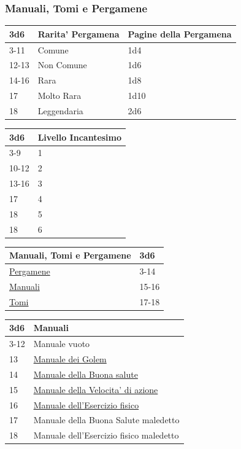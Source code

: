 \begin{multicols}{2}
{\subsubsection{Manuali, Tomi e Pergamene}\hypertarget{manualitomi}{}\label{manualitomi}\label{CPergamene}\hypertarget{CPergamene}{}

{\small \begin{tabularx}{0.48\textwidth}{lll}
		\toprule
\textbf{3d6} & \textbf{Rarita' Pergamena} & \textbf{Pagine della Pergamena}\\
\toprule
3-11 &Comune & 1d4 \\
12-13 &Non Comune & 1d6 \\
14-16 &Rara & 1d8 \\
17 & Molto Rara & 1d10\\
18 & Leggendaria & 2d6\\
\end{tabularx}}

\medskip

{\small \begin{tabularx}{0.48\textwidth}{ll}
		\toprule
	\textbf{3d6} & \textbf{Livello Incantesimo}\\
	\toprule
	3-9 & 1 \\
	10-12 & 2 \\
	13-16 & 3  \\
	17 & 4  \\
	18 & 5 \\
	18 & 6 \\
\end{tabularx}}

\medskip

{\small\begin{tabularx}{0.45\textwidth}{lX}
		\toprule
		\textbf{Manuali, Tomi e Pergamene}&\textbf{3d6}\\
		\toprule
		\hyperlink{manualitomi}{Pergamene} &3-14\\
		\hyperlink{manualitomi}{Manuali} &15-16\\
		\hyperlink{manualitomi}{Tomi} &17-18
\end{tabularx}}

\medskip\hypertarget{Manuali}{}

\noindent\begin{tabularx}{0.45\textwidth}{lX}
	\toprule
\textbf{3d6} & \textbf{Manuali}\\
\toprule
3-12 & Manuale vuoto\\
13 & \hyperlink{Manuale dei Golem}{Manuale dei Golem}\\
14 & \hyperlink{Manuale della Buonasalute}{Manuale della Buona salute}\\
15 & \hyperlink{Manuale della Velocita' di azione}{Manuale della Velocita' di azione}\\
16 & \hyperlink{Manuale dell'Esercizio fisico}{Manuale dell'Esercizio fisico}\\
17 & Manuale della Buona Salute maledetto\\
18 & Manuale dell'Esercizio fisico maledetto
\end{tabularx}

}
\end{multicols}
